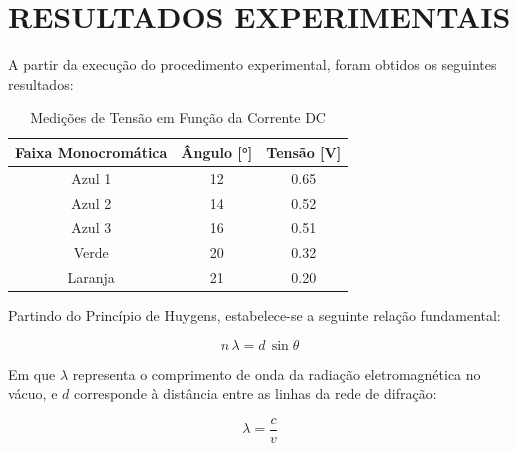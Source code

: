 \documentclass[10pt,twocolumn,letterpaper]{article}
\begin{document}

\section{RESULTADOS EXPERIMENTAIS}
\hspace{1cm} A partir da execução do procedimento experimental, foram obtidos os seguintes resultados:

\vspace{-.25cm}

\begin{table}[htbp]
    \centering
    \caption{Medições de Tensão em Função da Corrente DC}
    \label{tab:medicoes_tensao}
    \vspace{0.25cm}
    \begin{tabular}{ccc}
        \hline
        \rule{0pt}{3ex}\textbf{Faixa Monocromática} & \textbf{Ângulo} [°] & \textbf{Tensão} [V]\\[5pt]
        \hline
        \rule{0pt}{3ex}Azul 1 & 12 & 0.65 \\
        Azul 2 & 14 & 0.52 \\
        Azul 3 & 16 & 0.51 \\
        Verde & 20 & 0.32 \\
        Laranja & 21 & 0.20 \\[5pt]
        \hline
    \end{tabular}
\end{table}

\vspace{-.25cm}

Partindo do Princípio de Huygens, estabelece-se a seguinte relação fundamental:

\vspace{-.5cm}

\begin{equation*}
    n\,\lambda = d\, \sin{\theta}
\end{equation*}

\vspace{-.15cm}

\hspace{1cm} Em que $\lambda$ representa o comprimento de onda da radiação eletromagnética no vácuo, e $d$ corresponde à distância entre as linhas da rede de difração:

\vspace{-.25cm}

\begin{equation*}
    \lambda = \frac{c}{v}
\end{equation*}
\end{document}
